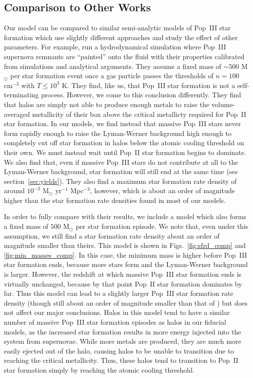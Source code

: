 \documentclass[a4paper,fleqn,usenatbib]{mnras}
\begin{document}
\subsection{Comparison to Other Works}
\label{sec:compare}

Our model can be compared to similar semi-analytic models of Pop~III star formation which use slightly different approaches and study the effect of other parameters. 
For example, \citet{jaacks_2017} run a hydrodynamical simulation where Pop~III supernova remnants are ``painted'' onto the fluid 
with their properties calibrated from simulations and analytical arguments. They assume a fixed mass of $\sim 500$ M$_\odot$ per star formation event once a gas particle passes the thresholds of $n = 100$ cm$^{-3}$ with $T \leq 10^3$ K. 
They find, 
like us, that Pop~III star formation is not a self-terminating process. However, we come to this conclusion differently. They find that halos are simply not able to produce enough metals to raise the volume-averaged metallicity of their box above the critical metallicty required for Pop~II star formation. In our models, we find 
instead that massive Pop~III stars never form 
rapidly enough to raise the Lyman-Werner background high 
enough to completely cut off star formation 
in halos below the atomic cooling threshold on their own. We must instead wait until Pop~II star formation begins to dominate. We also find that, even if massive Pop~III stars do not contribute at all to the Lyman-Werner background, star formation will still end at the same time (see section~\ref{sec:yields}). They also find a maximum star formation rate density of around 
$10^{-3}$ M$_\odot$ yr$^{-1}$ Mpc$^{-3}$, however, which is about an order of magnitude higher than the star formation rate densities found in most of our models. 

In order to fully compare with their results, we include a model which also forms a fixed mass of $500$ M$_\odot$ per star formation episode. 
We note that, even under this assumption, we still find a star formation rate density about an order of magnitude smaller than 
theirs. 
This model is shown in Figs.~\ref{fig:sfrd_comp} and \ref{fig:min_masses_comp}. In this case, the minimum mass is higher before Pop~III star formation ends, because more stars form and the Lyman-Werner background is larger. However, the redshift at which massive Pop~III star formation ends is virtually unchanged, because by that point Pop~II star formation dominates by far. Thus this model can lead to a slightly larger Pop~III star formation rate density (though still about an order of magnitude smaller than that of \citealt{jaacks_2017}) but does not affect our major conclusions. Halos in this model tend to have a similar number of massive Pop~III star formation episodes as halos in our fiducial models, as the increased star formation results in more energy injected into the system from supernovae. While more metals are produced, they are much more easily ejected out of the halo, causing halos to be unable to transition due to reaching the critical metallicity. Thus, these halos tend to transition to Pop~II star formation simply by reaching the atomic cooling threshold.
\end{document}
